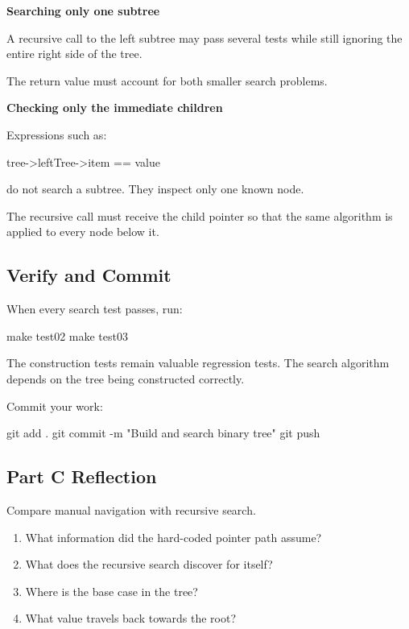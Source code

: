 \documentclass{csc2059practical}
\begin{document}
\begin{commonerror}
\textbf{Searching only one subtree}

A recursive call to the left subtree may pass several tests while still
ignoring the entire right side of the tree.

The return value must account for both smaller search problems.
\end{commonerror}

\begin{commonerror}
\textbf{Checking only the immediate children}

Expressions such as:

\begin{cppcode}
tree->leftTree->item == value
\end{cppcode}

do not search a subtree. They inspect only one known node.

The recursive call must receive the child pointer so that the same algorithm is
applied to every node below it.
\end{commonerror}

\subsection{Verify and Commit}

When every search test passes, run:

\begin{terminal}
make test02
make test03
\end{terminal}

The construction tests remain valuable regression tests. The search algorithm
depends on the tree being constructed correctly.

Commit your work:

\begin{terminal}
git add .
git commit -m "Build and search binary tree"
git push
\end{terminal}

\subsection{Part C Reflection}

\begin{reflectionbox}
Compare manual navigation with recursive search.

\begin{enumerate}
    \item What information did the hard-coded pointer path assume?
    \item What does the recursive search discover for itself?
    \item Where is the base case in the tree?
    \item What value travels back towards the root?
\end{enumerate}
\end{reflectionbox}
\end{document}
